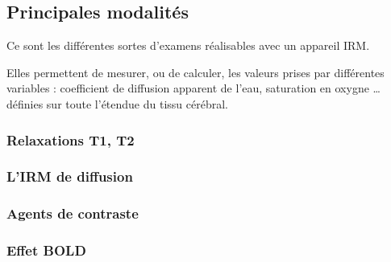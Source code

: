 \subsection{Principales modalit\'es}

Ce sont les diff\'erentes sortes d'examens r\'ealisables avec un appareil IRM.

\par
Elles permettent de mesurer, ou de calculer, les valeurs prises par diff\'erentes variables : %
coefficient de diffusion apparent de l'eau, saturation en oxygne \dots %
d\'efinies sur toute l'\'etendue du tissu c\'er\'ebral.

\subsubsection{Relaxations T1, T2}




\subsubsection{L'IRM de diffusion}







\subsubsection{Agents de contraste}




\subsubsection{Effet BOLD}













\cite{christen2012l}%



